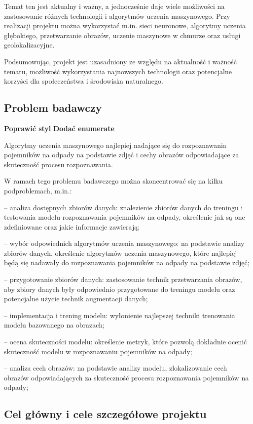 \documentclass[12pt,twoside]{book}
\begin{document}
Temat ten jest aktualny i ważny, a jednocześnie daje wiele możliwości na zastosowanie różnych technologii i algorytmów uczenia maszynowego. Przy realizacji projektu można wykorzystać m.in. sieci neuronowe, algorytmy uczenia głębokiego, przetwarzanie obrazów, uczenie maszynowe w chmurze oraz usługi geolokalizacyjne.

Podsumowując, projekt \topic jest uzasadniony ze względu na aktualność i ważność tematu, możliwość wykorzystania najnowszych technologii oraz potencjalne korzyści dla społeczeństwa i środowiska naturalnego.

\subsection{Problem badawczy}

\textbf{Poprawić styl}
\textbf{Dodać enumerate}

Algorytmy uczenia maszynowego najlepiej nadające się do rozpoznawania pojemników na odpady na podstawie zdjęć i cechy obrazów odpowiadające za skuteczność procesu rozpoznawania.

W ramach tego problemu badawczego można skoncentrować się na kilku podproblemach, m.in.:

    -- analiza dostępnych zbiorów danych: znalezienie zbiorów danych do treningu i testowania modelu rozpoznawania pojemników na odpady, określenie jak są one zdefiniowane oraz jakie informacje zawierają;

    -- wybór odpowiednich algorytmów uczenia maszynowego: na podstawie analizy zbiorów danych, określenie algorytmów uczenia maszynowego, które najlepiej będą się nadawały do rozpoznawania pojemników na odpady na podstawie zdjęć;

    -- przygotowanie zbiorów danych: zastosowanie technik przetwarzania obrazów, aby zbiory danych były odpowiednio przygotowane do treningu modelu oraz potencjalne użycie technik augmentacji danych;

    -- implementacja i trening modelu: wyłonienie najlepszej techniki trenowania modelu bazowanego na obrazach;

    -- ocena skuteczności modelu: określenie metryk, które pozwolą dokładnie ocenić skuteczność modelu w rozpoznawaniu pojemników na odpady;

    -- analiza cech obrazów: na podstawie analizy modelu, zlokalizowanie cech obrazów odpowiadających za skuteczność procesu rozpoznawania pojemników na odpady;

\subsection{Cel główny i cele szczegółowe projektu}
\end{document}
